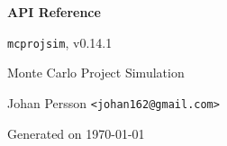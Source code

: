 \documentclass[11pt,a4paper,twoside,openright]{report}
\begin{document}
\begin{titlepage}
  \centering
  \vspace*{2.0cm}
  {\Huge\bfseries\color{brandblue}API Reference\par}
  \vspace{1.2cm}
  {\Large \texttt{mcprojsim}, v0.14.1\par}
  \vspace{1.2cm}
  {\Large Monte Carlo Project Simulation\par}
  \vfill
  {\large Johan Persson \texttt{<johan162@gmail.com>}\par}
  {\large Generated on \today\par}
\end{titlepage}

\tableofcontents
\clearpage

\end{document}
